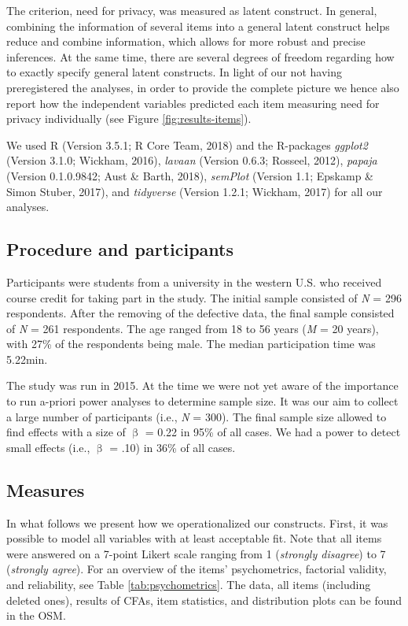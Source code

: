 \documentclass[man,floatsintext]{apa6}
\theoremstyle{definition}
\theoremstyle{definition}
\theoremstyle{definition}
\theoremstyle{remark}
\begin{document}
The criterion, need for privacy, was measured as latent construct. In
general, combining the information of several items into a general
latent construct helps reduce and combine information, which allows for
more robust and precise inferences. At the same time, there are several
degrees of freedom regarding how to exactly specify general latent
constructs. In light of our not having preregistered the analyses, in
order to provide the complete picture we hence also report how the
independent variables predicted each item measuring need for privacy
individually (see Figure \ref{fig:results-items}).

We used R (Version 3.5.1; R Core Team, 2018) and the R-packages
\emph{ggplot2} (Version 3.1.0; Wickham, 2016), \emph{lavaan} (Version
0.6.3; Rosseel, 2012), \emph{papaja} (Version 0.1.0.9842; Aust \& Barth,
2018), \emph{semPlot} (Version 1.1; Epskamp \& Simon Stuber, 2017), and
\emph{tidyverse} (Version 1.2.1; Wickham, 2017) for all our analyses.

\hypertarget{procedure-and-participants}{%
\subsection{Procedure and
participants}\label{procedure-and-participants}}

Participants were students from a university in the western U.S. who
received course credit for taking part in the study. The initial sample
consisted of \emph{N} = 296 respondents. After the removing of the
defective data, the final sample consisted of \emph{N} = 261
respondents. The age ranged from 18 to 56 years (\emph{M} = 20 years),
with 27\% of the respondents being male. The median participation time
was 5.22min.

The study was run in 2015. At the time we were not yet aware of the
importance to run a-priori power analyses to determine sample size. It
was our aim to collect a large number of participants (i.e., \emph{N} =
300). The final sample size allowed to find effects with a size of
\(\upbeta\) = 0.22 in 95\% of all cases. We had a power to detect small
effects (i.e., \(\upbeta\) = .10) in 36\% of all cases.

\hypertarget{measures}{%
\subsection{Measures}\label{measures}}

In what follows we present how we operationalized our constructs. First,
it was possible to model all variables with at least acceptable fit.
Note that all items were answered on a 7-point Likert scale ranging from
1 (\emph{strongly disagree}) to 7 (\emph{strongly agree}). For an
overview of the items' psychometrics, factorial validity, and
reliability, see Table \ref{tab:psychometrics}. The data, all items
(including deleted ones), results of CFAs, item statistics, and
distribution plots can be found in the OSM.
\end{document}
